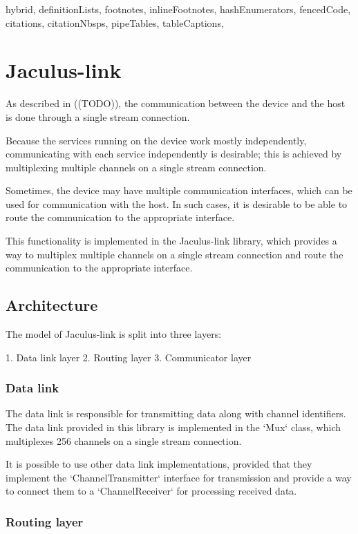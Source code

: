 \begin{markdown*}{%
  hybrid,
  definitionLists,
  footnotes,
  inlineFootnotes,
  hashEnumerators,
  fencedCode,
  citations,
  citationNbsps,
  pipeTables,
  tableCaptions,
}

\chapter{Jaculus-link}

As described in ((TODO)), the communication between the device and the host is done through a single stream connection.

Because the services running on the device work mostly independently, communicating with each service independently is desirable; this is achieved by multiplexing multiple channels on a single stream connection.

Sometimes, the device may have multiple communication interfaces, which can be used for communication with the host. In such cases, it is desirable to be able to route the communication to the appropriate interface.

This functionality is implemented in the Jaculus-link library, which provides a way to multiplex multiple channels on a single stream connection and route the communication to the appropriate interface.

\section{Architecture}

The model of Jaculus-link is split into three layers:

1. Data link layer
2. Routing layer
3. Communicator layer

\subsection{Data link}

The data link is responsible for transmitting data along with channel identifiers. The data link provided in this library is implemented in the `Mux` class, which multiplexes 256 channels on a single stream connection.

It is possible to use other data link implementations, provided that they implement the `ChannelTransmitter` interface for transmission and provide a way to connect them to a `ChannelReceiver` for processing received data.

\subsection{Routing layer}


\end{markdown*}
